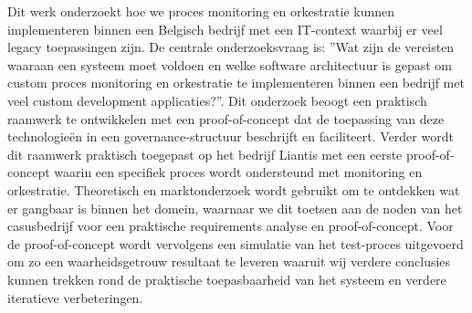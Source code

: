 
%
%
%
%
%

%


Dit werk onderzoekt hoe we proces monitoring en orkestratie kunnen implementeren binnen een Belgisch bedrijf met een IT-context waarbij er veel legacy toepassingen zijn. De centrale onderzoeksvraag is: ”Wat zijn de vereisten waaraan een systeem moet voldoen en welke software architectuur is gepast om custom proces monitoring en orkestratie te implementeren binnen een bedrijf met veel custom development applicaties?”.
Dit onderzoek beoogt een praktisch raamwerk te ontwikkelen met een proof-of-concept dat de toepassing van deze technologieën in een governance-structuur beschrijft en faciliteert. Verder wordt dit raamwerk praktisch toegepast op het bedrijf Liantis met een eerste proof-of-concept waarin een specifiek proces wordt ondersteund met monitoring en orkestratie. Theoretisch en marktonderzoek wordt gebruikt om te ontdekken wat er gangbaar is binnen het domein, waarnaar we dit toetsen aan de noden van het casusbedrijf voor een praktische requirements analyse en proof-of-concept. Voor de proof-of-concept wordt vervolgens een simulatie van het test-proces uitgevoerd om zo een waarheidsgetrouw resultaat te leveren waaruit wij verdere conclusies kunnen trekken rond de praktische toepasbaarheid van het systeem en verdere iteratieve verbeteringen.



\chapter*{}

\lipsum[1-4]
